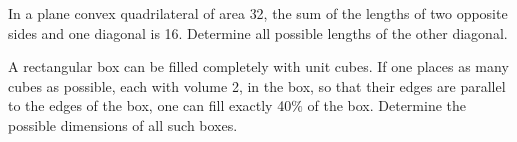 \item In a plane convex quadrilateral of area 32, the sum of the lengths of two opposite sides and one diagonal is 16. Determine all possible lengths of the other diagonal.
\item A rectangular box can be filled completely with unit cubes. If one places as many cubes as possible, each with volume 2, in the box, so that their edges are parallel to the edges of the box, one can fill exactly 40$\%$ of the box. Determine the possible dimensions of all such boxes.


